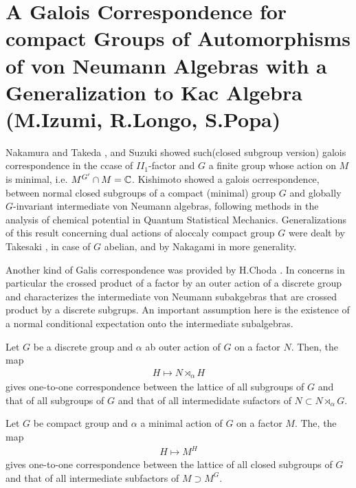 \section{A Galois Correspondence for compact Groups of Automorphisms of von Neumann Algebras with a Generalization to Kac Algebra (M.Izumi, R.Longo, S.Popa)}
\cite{izumi1998galois}

Nakamura and Takeda \cite{nakamura1960galois}, and Suzuki showed such(closed subgroup version) galois correspondence in the ccase of $II_1$-factor and $G$ a finite group whose action on $M$ is minimal, i.e. $M^{G'} \cap M = \mathbb{C}$.
Kishimoto \cite{kishimoto1977remarks} showed a galois ocrrespondence, between normal closed subgroups of a compact (minimal) group $G$ and globally $G$-invariant intermediate von Neumann algebras,
following methods in the analysis of chemical potential in Quantum Statistical Mechanics.
Generalizations of this result concerning dual actions of aloccaly compact group $G$ were dealt by Takesaki \cite{araki1977extension}, in case of $G$ abelian, and by Nakagami in more generality.

Another kind of Galis correspondence was provided by H.Choda \cite{choda1978galois}.
In concerns in particular the crossed product of a factor by an outer action of a discrete group and characterizes the intermediate von Neumann subakgebras that are crossed product by a discrete subgrups.
An important assumption here is the existence of a normal conditional expectation onto the intermediate subalgebras. 
\begin{theorem}
  Let $G$ be a discrete group and $\alpha$ ab outer action of $G$ on a factor $N$.
  Then, the map
  \begin{align*}
    H \mapsto N \rtimes_\alpha H
  \end{align*}
  gives one-to-one correspondence between the lattice of all subgroups of $G$ and that of all subgroups of $G$ and that of all intermedidate sufactors of $N \subset N \rtimes_\alpha G$.
\end{theorem}

\begin{theorem}%
  Let $G$ be  compact group and $\alpha$ a minimal action of $G$ on a factor $M$.
  The, the map
  \begin{align*}
    H \mapsto M^H
  \end{align*}
  gives one-to-one correspondence between the lattice of all closed subgroups of $G$ and that of all intermediate subfactors of $M \supset M^G$.
\end{theorem}

